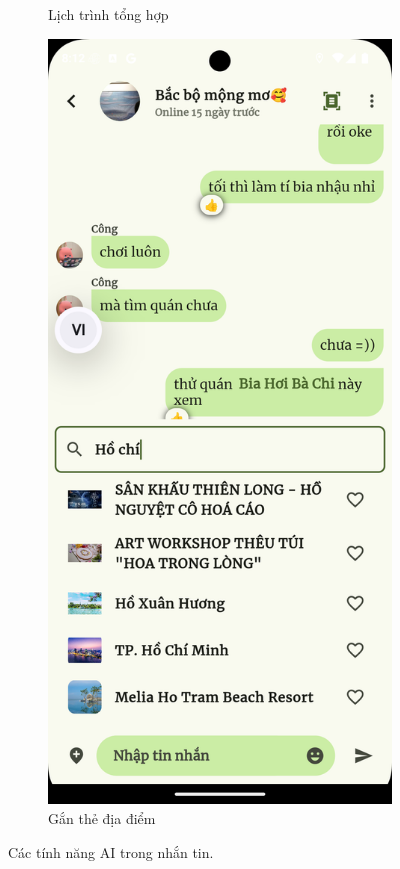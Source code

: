 \begin{figure}[H]
\begin{subfigure}{0.326\textwidth}
        \caption{Lịch trình tổng hợp}
        \label{fig:func_summary_result}
    \end{subfigure}
    \hfill
    \begin{subfigure}{0.326\textwidth}
        \includegraphics[width=1\linewidth]{figures/c4/system_func/tag_loc.png}
        \caption{Gắn thẻ địa điểm}
        \label{fig:func_tag_loc}
    \end{subfigure}
    \caption{Các tính năng AI trong nhắn tin.}
    \label{fig:messaging-2}
\end{figure}

